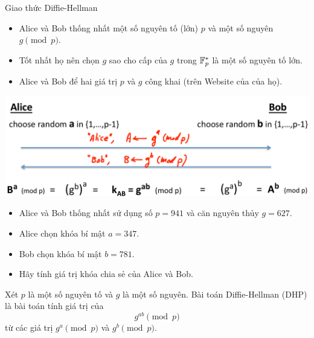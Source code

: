 \begin{frame}{Giao thức Diffie-Hellman}
  \begin{itemize}
  \item Alice và Bob thống nhất một số nguyên tố (lớn) $p$ và một số nguyên $g \pmod{p}$.
  \item Tốt nhất họ nên chọn $g$ sao cho cấp của $g$ trong $\mathbb{F}_p^*$ là một số nguyên tố lớn.
  \item Alice và Bob để hai giá trị $p$ và $g$ công khai (trên Website của của họ).
  \end{itemize}
  \begin{block}{}
    \includegraphics[width=\textwidth]{DH.pdf}
  \end{block}
\end{frame}
\begin{frame}
  \begin{xmpl}
    \begin{itemize}
    \item Alice và Bob thống nhất sử dụng số $p=941$ và căn nguyên thủy $g = 627$.
    \item Alice chọn khóa bí mật $a = 347$.
    \item Bob chọn khóa bí mật $b = 781$.
    \item Hãy tính giá trị khóa chia sẻ của Alice và Bob.
    \end{itemize}
  \end{xmpl}
\end{frame}

\begin{frame}
  \begin{dfntn}
    Xét $p$ là một số nguyên tố và $g$ là một số nguyên. Bài toán \alert{Diffie-Hellman} (DHP) là bài toán tính giá trị của 
    $$
    g^{ab}\pmod{p}
    $$
    từ các giá trị $g^a\pmod{p}$ và $g^b\pmod{p}$.
  \end{dfntn}
\end{frame}

